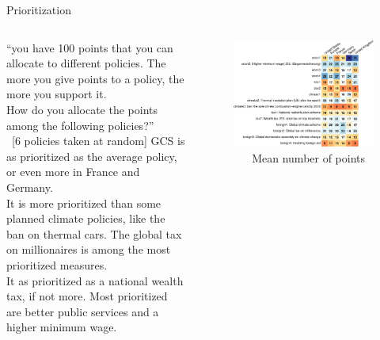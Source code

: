 \documentclass[aspectratio=169,xcolor=dvipsnames, 11pt,mathserif]{beamer}
\begin{document}
\begin{frame}{Prioritization \hyperlink{donation}{}\label{prioritization}}
    \begin{columns}
        \begin{column}{0.35\textwidth}\vspace{-1cm}
            \bbvs \ip %
			``you have 100 points that you can allocate to different policies. The more you give points to a policy, the more you support it.\\ %
            How do you allocate the points among the following policies?'' \\~[6 policies taken at random]
            \ip GCS is as prioritized as the average policy, or even more in France and Germany. \\ It is more prioritized than some planned climate policies, like the ban on thermal cars.
            \ip The global tax on millionaires is among the most prioritized measures.\\ It as prioritized as a national wealth tax, if not more.
            \ip Most prioritized are better public services and a higher minimum wage.
            \ee        %
        \end{column}
        \begin{column}{0.65\textwidth}\vspace{-.6cm}
            \begin{figure}
                \centering 
                \caption{\quad ~ \quad ~ \quad Mean number of points}
                \vspace{-.3cm}
                \includegraphics[width=\columnwidth]{../figures/country_comparison/points_mean.pdf} 
            \end{figure}
        \end{column}
    \end{columns}
\end{frame}
\end{document}
